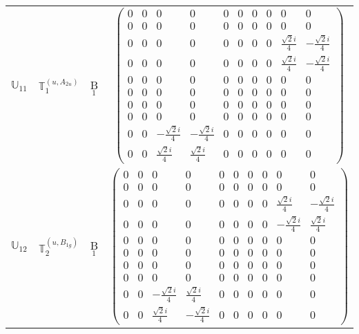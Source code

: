 \documentclass[fleqn,10pt,landscape]{article}
\begin{document}
\begin{itemize}
\begin{center}
\begin{longtable}{c|c|c|c}
$ \mathbb{U}_{11} $ & $\mathbb{T}_{1}^{(u,A_{2u})}$ & B$_{1}$ & $\begin{pmatrix} 0 & 0 & 0 & 0 & 0 & 0 & 0 & 0 & 0 & 0 \\ 0 & 0 & 0 & 0 & 0 & 0 & 0 & 0 & 0 & 0 \\ 0 & 0 & 0 & 0 & 0 & 0 & 0 & 0 & \frac{\sqrt{2} i}{4} & - \frac{\sqrt{2} i}{4} \\ 0 & 0 & 0 & 0 & 0 & 0 & 0 & 0 & \frac{\sqrt{2} i}{4} & - \frac{\sqrt{2} i}{4} \\ 0 & 0 & 0 & 0 & 0 & 0 & 0 & 0 & 0 & 0 \\ 0 & 0 & 0 & 0 & 0 & 0 & 0 & 0 & 0 & 0 \\ 0 & 0 & 0 & 0 & 0 & 0 & 0 & 0 & 0 & 0 \\ 0 & 0 & 0 & 0 & 0 & 0 & 0 & 0 & 0 & 0 \\ 0 & 0 & - \frac{\sqrt{2} i}{4} & - \frac{\sqrt{2} i}{4} & 0 & 0 & 0 & 0 & 0 & 0 \\ 0 & 0 & \frac{\sqrt{2} i}{4} & \frac{\sqrt{2} i}{4} & 0 & 0 & 0 & 0 & 0 & 0 \end{pmatrix}$ \\
$ \mathbb{U}_{12} $ & $\mathbb{T}_{2}^{(u,B_{1g})}$ & B$_{1}$ & $\begin{pmatrix} 0 & 0 & 0 & 0 & 0 & 0 & 0 & 0 & 0 & 0 \\ 0 & 0 & 0 & 0 & 0 & 0 & 0 & 0 & 0 & 0 \\ 0 & 0 & 0 & 0 & 0 & 0 & 0 & 0 & \frac{\sqrt{2} i}{4} & - \frac{\sqrt{2} i}{4} \\ 0 & 0 & 0 & 0 & 0 & 0 & 0 & 0 & - \frac{\sqrt{2} i}{4} & \frac{\sqrt{2} i}{4} \\ 0 & 0 & 0 & 0 & 0 & 0 & 0 & 0 & 0 & 0 \\ 0 & 0 & 0 & 0 & 0 & 0 & 0 & 0 & 0 & 0 \\ 0 & 0 & 0 & 0 & 0 & 0 & 0 & 0 & 0 & 0 \\ 0 & 0 & 0 & 0 & 0 & 0 & 0 & 0 & 0 & 0 \\ 0 & 0 & - \frac{\sqrt{2} i}{4} & \frac{\sqrt{2} i}{4} & 0 & 0 & 0 & 0 & 0 & 0 \\ 0 & 0 & \frac{\sqrt{2} i}{4} & - \frac{\sqrt{2} i}{4} & 0 & 0 & 0 & 0 & 0 & 0 \end{pmatrix}$ \\

\end{longtable}
\end{center}
\end{itemize}
\end{document}
